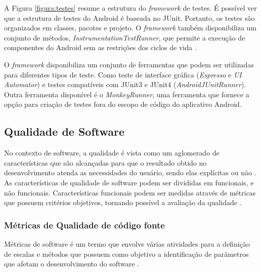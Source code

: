 A Figura \ref{figura:testes} resume a estrutura do \textit{framework} de testes. É possível ver que a estrutura de testes do Android é baseada no JUnit. Portanto, os testes são organizados em classes, pacotes e projeto. O \textit{framework} também disponibiliza um conjunto de métodos, \textit{InstrumentationTestRunner}, que permite a execução de componentes do Android sem as restrições dos ciclos de vida \cite{androidTesting2015}.

O \textit{framework} disponibiliza um conjunto de ferramentas que podem ser utilizadas para diferentes tipos de teste. Como teste de interface gráfica (\textit{Espresso} e \textit{UI Automator}) e testes compatíveis com JUnit3 e JUnit4 (\textit{AndroidJUnitRunner}). Outra ferramenta disponível é o \textit{MonkeyRunner}, uma ferramenta que fornece a opção para criação de testes fora do escopo de código do aplicativo Android.




  \subsection{Qualidade de Software}

No contexto de software, a qualidade é vista como um aglomerado de características
que são alcançadas para que o resultado obtido no desenvolvimento
atenda as necessidades do usuário, sendo elas explícitas ou não \cite{rocha2001}.
As características de qualidade de software podem ser divididas em funcionais,
e não funcionais. Características funcionais podem ser medidas através de métricas
que possuem critérios objetivos, tornando possível a avaliação da qualidade \cite{meirelles2013}.

    \subsubsection{Métricas de Qualidade de código fonte}

Métricas de software é um termo que envolve várias atividades para a definição de
escalas e métodos que possuem como objetivo a identificação de parâmetros que afetam o
desenvolvimento do software \cite{metrics}.


